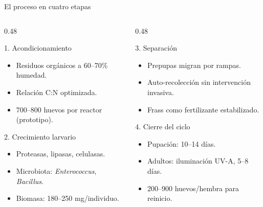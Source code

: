 \documentclass[aspectratio=169, 11pt]{beamer}
\begin{document}
\begin{frame}{El proceso en cuatro etapas}
    \begin{columns}[T]
        \begin{column}{0.48\textwidth}
            \begin{block}{1. Acondicionamiento}
                \begin{itemize}
                    \item Residuos org\'{a}nicos a 60--70\% humedad.
                    \item Relaci\'{o}n C:N optimizada.
                    \item 700--800 huevos por reactor (prototipo).
                \end{itemize}
            \end{block}
            \begin{block}{2. Crecimiento larvario}
                \begin{itemize}
                    \item Proteasas, lipasas, celulasas.
                    \item Microbiota: \textit{Enterococcus}, \textit{Bacillus}.
                    \item Biomasa: 180--250 mg/individuo.
                \end{itemize}
            \end{block}
        \end{column}
        \begin{column}{0.48\textwidth}
            \begin{block}{3. Separaci\'{o}n}
                \begin{itemize}
                    \item Prepupas migran por rampas.
                    \item Auto-recolecci\'{o}n sin intervenci\'{o}n invasiva.
                    \item Frass como fertilizante estabilizado.
                \end{itemize}
            \end{block}
            \begin{block}{4. Cierre del ciclo}
                \begin{itemize}
                    \item Pupaci\'{o}n: 10--14 d\'{i}as.
                    \item Adultos: iluminaci\'{o}n UV-A, 5--8 d\'{i}as.
                    \item 200--900 huevos/hembra para reinicio.
                \end{itemize}
            \end{block}
        \end{column}
    \end{columns}
\end{frame}
\end{document}
